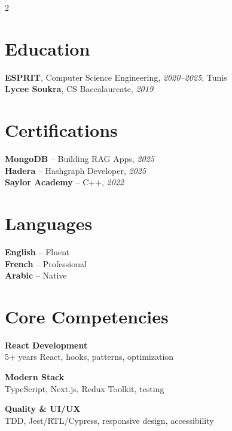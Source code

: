\documentclass[10pt,a4paper]{article}
\begin{document}
\vspace{6pt}
\begin{multicols}{2}

\section*{Education}
{\small
\textbf{ESPRIT}, Computer Science Engineering, \textit{2020--2025}, Tunis\\[1pt]
\textbf{Lycee Soukra}, CS Baccalaureate, \textit{2019}
}

\vspace{3pt}
\section*{Certifications}
{\small
\textbf{MongoDB} -- Building RAG Apps, \textit{2025}\\[1pt]
\textbf{Hadera} -- Hashgraph Developer, \textit{2025}\\[1pt]
\textbf{Saylor Academy} -- C++, \textit{2022}
}

\columnbreak

\section*{Languages}
{\small
\textbf{English} -- Fluent\\[1pt]
\textbf{French} -- Professional\\[1pt]
\textbf{Arabic} -- Native
}

\vspace{3pt}
\section*{Core Competencies}
{\small
\textbf{React Development}\\[1pt]
5+ years React, hooks, patterns, optimization

\vspace{4pt}
\textbf{Modern Stack}\\[1pt]
TypeScript, Next.js, Redux Toolkit, testing

\vspace{4pt}
\textbf{Quality \& UI/UX}\\[1pt]
TDD, Jest/RTL/Cypress, responsive design, accessibility
}

\end{multicols}
\end{document}
